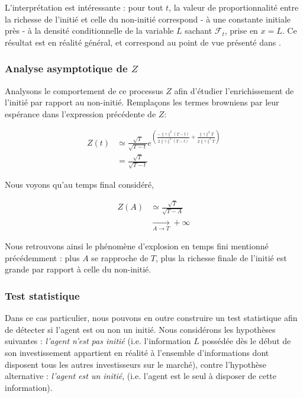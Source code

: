 \documentclass[../finalreport.tex]{subfiles}
\begin{document}
\par L'interprétation est intéressante : pour tout $t$, la valeur de proportionnalité entre la richesse de l'initié et celle du non-initié correspond - à une constante initiale près -  à la densité conditionnelle de la variable $L$ sachant $\mathcal{F}_t$, prise en $x = L$. Ce résultat est en réalité général, et correspond au point de vue présenté dans \cite{art5}.

\subsubsection{Analyse asymptotique de $Z$} \label{analyse_asympt}

\par Analysons le comportement de ce processus $Z$ afin d'étudier l'enrichissement de l'initié par rapport au non-initié. Remplaçons les termes browniens par leur espérance dans l'expression précédente de $Z$:

\begin{displaymath}
	\begin{split}
	Z \left( t \right) &\simeq \frac{\sqrt{T}}{\sqrt{T - t}} e^{\left( \frac{- \| \gamma \|^2 \left( T  - t \right) }{2 \| \gamma \|^2 \left( T - t \right)} + \frac{\| \gamma \|^2 T }{2 \| \gamma \|^2 T } \right) } \\
	&= \frac{\sqrt{T}}{\sqrt{T - t}}
	\end{split}
\end{displaymath}

\par Nous voyons qu'au temps final considéré,

\begin{displaymath}
	\begin{split}
	Z \left( A \right) &\simeq \frac{\sqrt{T}}{\sqrt{T - A}} \\
	&\xrightarrow[A \to T]{} + \infty
	\end{split}
\end{displaymath}

\par Nous retrouvons ainsi le phénomène d'explosion en temps fini mentionné précédemment : plus $A$ se rapproche de $T$, plus la richesse finale de l'initié est grande par rapport à celle du non-initié.

\subsubsection{Test statistique}
\par Dans ce cas particulier, nous pouvons en outre construire un test statistique afin de détecter si l'agent est ou non un initié. Nous considérons les hypothèses suivantes : \emph{l'agent n'est pas initié} (i.e. l'information $L$ possédée dès le début de son investissement appartient en réalité à l'ensemble d'informations dont disposent tous les autres investisseurs sur le marché), contre l'hypothèse alternative : \emph{l'agent est un initié}, (i.e. l'agent est le seul à disposer de cette information). \\
\end{document}
